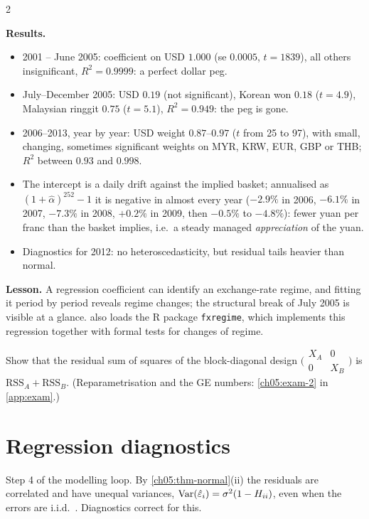 \begin{paracol}{2}
\begin{casestudy}
\textbf{Results.}
\begin{itemize}
  \item 2001 -- June 2005: coefficient on USD $1.000$ (se $0.0005$, $t=1839$), all others insignificant,
        $R^2=0.9999$: a perfect dollar peg.
  \item July--December 2005: USD $0.19$ (not significant), Korean won $0.18$ ($t=4.9$), Malaysian ringgit $0.75$
        ($t=5.1$), $R^2=0.949$: the peg is gone.
  \item 2006--2013, year by year: USD weight $0.87$--$0.97$ ($t$ from 25 to 97), with small, changing, sometimes
        significant weights on MYR, KRW, EUR, GBP or THB; $R^2$ between $0.93$ and $0.998$.
  \item The intercept is a daily drift against the implied basket; annualised as $(1+\hat\alpha)^{252}-1$ it is negative in
        almost every year ($-2.9\%$ in 2006, $-6.1\%$ in 2007, $-7.3\%$ in 2008, $+0.2\%$ in 2009, then $-0.5\%$ to $-4.8\%$):
        fewer yuan per franc than the basket implies, i.e.\ a steady managed \emph{appreciation} of the yuan.
  \item Diagnostics for 2012: no heteroscedasticity, but residual tails heavier than normal.
\end{itemize}
\textbf{Lesson.} A regression coefficient can identify an exchange-rate regime, and fitting it period by period reveals
regime changes; the structural break of July 2005 is visible at a glance.  also loads the R
package \texttt{fxregime}, which implements this regression together with formal tests for changes of regime.
\end{casestudy}

\begin{exercise}\label{ch05:exam-2-short}
Show that the residual sum of squares of the block-diagonal design $\bigl(\begin{smallmatrix}X_A&0\\0&X_B\end{smallmatrix}\bigr)$ is $\text{RSS}_A+\text{RSS}_B$. (Reparametrisation and the GE numbers: \cref{ch05:exam-2} in \cref{app:exam}.)
\end{exercise}

\section{Regression diagnostics}\label{ch05:sec-diag}
Step 4 of the modelling loop. By \cref{ch05:thm-normal}(ii) the residuals are correlated and have unequal variances,
$\operatorname{Var}(\hat\varepsilon_i)=\sigma^2(1-H_{ii})$, even when the errors are i.i.d.\ . Diagnostics correct for this.


\end{paracol}
